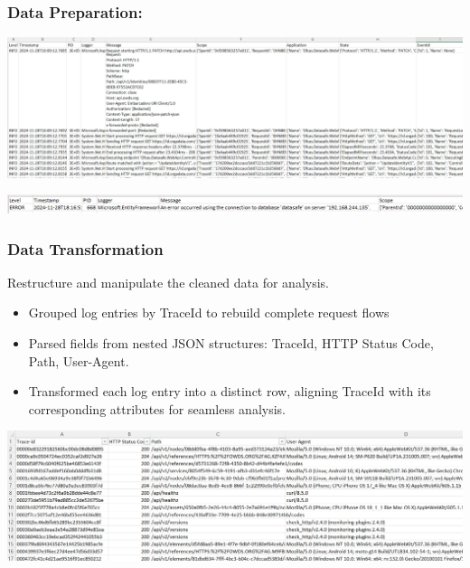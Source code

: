\documentclass[10pt, a4paper]{beamer}
\begin{document}
	\begin{frame}
		\frametitle{Data Preparation:} 
		
		\begin{minipage}{\textwidth}
			\centering
			\includegraphics[width=1\textwidth]{images/csvFIle.png}
		\end{minipage}
		\vspace{0.5cm} %
		\begin{minipage}{\textwidth}
			\centering
			\includegraphics[width=1\textwidth]{images/error.png}
		\end{minipage}
		
	\end{frame}
	
	
	\begin{frame}
		\frametitle{Data Transformation}
		\begin{block}{}
			Restructure and manipulate the cleaned data for analysis.
			\begin{itemize}
				\item Grouped log entries by TraceId to rebuild complete request flows
				\item Parsed fields from nested JSON structures: TraceId, HTTP Status Code, Path, User-Agent.
				\item Transformed each log entry into a distinct row, aligning TraceId with its corresponding attributes for seamless analysis.
			\end{itemize}
		\end{block}
		
		\vfill
		
		\centering
		\includegraphics[width=1\textwidth]{images/DataTransformation.png} %
		
		\vskip 0.1cm %
		\centering
	\end{frame}
	
\end{document}
